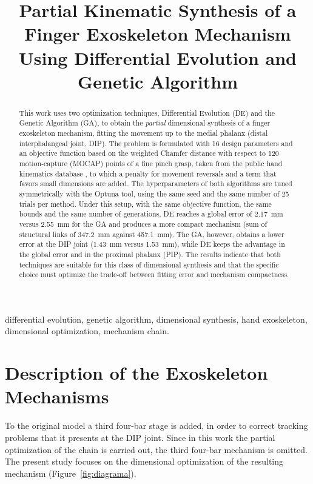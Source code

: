 \documentclass[conference]{IEEEtran}
\begin{document}
\title{Partial Kinematic Synthesis of a Finger Exoskeleton Mechanism Using Differential Evolution and Genetic Algorithm}

\author{}

\maketitle
\thispagestyle{fancy}

\begin{abstract}
This work uses two optimization techniques, Differential Evolution (DE) and the
Genetic Algorithm (GA), to obtain the \emph{partial} dimensional synthesis of a
finger exoskeleton mechanism, fitting the movement up to the medial phalanx
(distal interphalangeal joint, DIP). The problem is formulated with 16 design
parameters and an objective function based on the weighted Chamfer distance with
respect to 120 motion-capture (MOCAP) points of a fine pinch grasp, taken from
the public hand kinematics database \cite{ref_pizzolato}, to which a penalty for
movement reversals and a term that favors small dimensions are added. The
hyperparameters of both algorithms are tuned symmetrically with the Optuna tool,
using the same seed and the same number of 25 trials per method. Under this
setup, with the same objective function, the same bounds and the same number of
generations, DE reaches a global error of 2.17~mm versus 2.55~mm for the GA and
produces a more compact mechanism (sum of structural links of 347.2~mm against
457.1~mm). The GA, however, obtains a lower error at the DIP joint (1.43~mm
versus 1.53~mm), while DE keeps the advantage in the global error and in the
proximal phalanx (PIP). The results indicate that both techniques are suitable
for this class of dimensional synthesis and that the specific choice must
optimize the trade-off between fitting error and mechanism compactness.
\end{abstract}

\begin{IEEEkeywords}
differential evolution, genetic algorithm, dimensional synthesis, hand
exoskeleton, dimensional optimization, mechanism chain.
\end{IEEEkeywords}



\section{Description of the Exoskeleton Mechanisms}
To the original model \cite{ref_palma} a third four-bar stage is added, in order to correct
tracking problems that it presents at the DIP joint. Since in this work the
partial optimization of the chain is carried out, the third four-bar mechanism is
omitted. The present study focuses on the dimensional optimization of the
resulting mechanism (Figure~\ref{fig:diagrama}).
\end{document}
